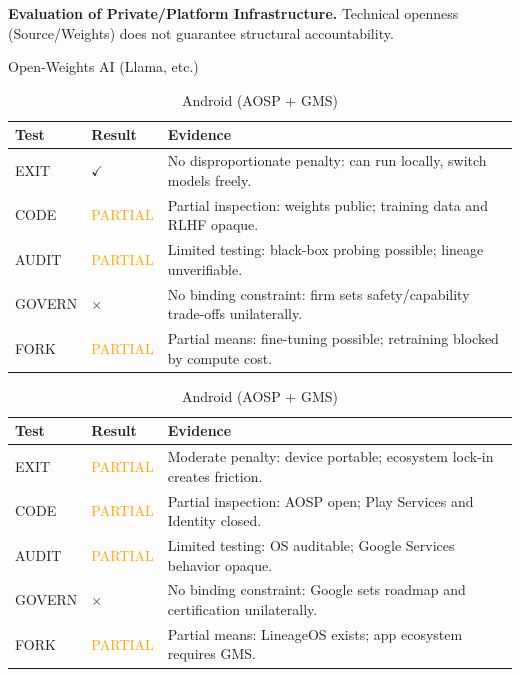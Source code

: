 \begin{table}[htbp]
    \centering
    \caption{\textbf{Evaluation of Private/Platform Infrastructure.} Technical openness (Source/Weights) does not guarantee structural accountability.}
    \label{tab:corp_infra}

    \begin{subtable}{1\textwidth}
        \centering
        \caption{Open-Weights AI (Llama, etc.)}
        \small
        \begin{tabular}{@{}llp{8.5cm}@{}}
            \toprule
            \textbf{Test} & \textbf{Result} & \textbf{Evidence} \\
            \midrule
            EXIT & $\checkmark$ & No disproportionate penalty: can run locally, switch models freely. \\
            CODE & \textcolor{orange}{PARTIAL} & Partial inspection: weights public; training data and RLHF opaque. \\
            AUDIT & \textcolor{orange}{PARTIAL} & Limited testing: black-box probing possible; lineage unverifiable. \\
            GOVERN & $\times$ & No binding constraint: firm sets safety/capability trade-offs unilaterally. \\
            FORK & \textcolor{orange}{PARTIAL} & Partial means: fine-tuning possible; retraining blocked by compute cost. \\
            \bottomrule
        \end{tabular}
        \vspace{0.3cm}
    \end{subtable}

    \begin{subtable}{1\textwidth}
        \centering
        \caption{Android (AOSP + GMS)}
        \small
        \begin{tabular}{@{}llp{8.5cm}@{}}
            \toprule
            \textbf{Test} & \textbf{Result} & \textbf{Evidence} \\
            \midrule
            EXIT & \textcolor{orange}{PARTIAL} & Moderate penalty: device portable; ecosystem lock-in creates friction. \\
            CODE & \textcolor{orange}{PARTIAL} & Partial inspection: AOSP open; Play Services and Identity closed. \\
            AUDIT & \textcolor{orange}{PARTIAL} & Limited testing: OS auditable; Google Services behavior opaque. \\
            GOVERN & $\times$ & No binding constraint: Google sets roadmap and certification unilaterally. \\
            FORK & \textcolor{orange}{PARTIAL} & Partial means: LineageOS exists; app ecosystem requires GMS. \\
            \bottomrule
        \end{tabular}
        \vspace{0.3cm}
    \end{subtable}


\end{table}
